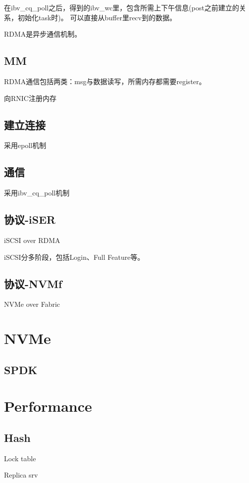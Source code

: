 在ibv\_cq\_poll之后，得到的ibv\_wc里，包含所需上下午信息(post之前建立的关系，初始化task时)。
可以直接从buffer里recv到的数据。

RDMA是异步通信机制。

\subsection{MM}

RDMA通信包括两类：msg与数据读写，所需内存都需要register。

向RNIC注册内存

\subsection{建立连接}

采用epoll机制

\subsection{通信}

采用ibv\_cq\_poll机制

\subsection{协议-iSER}

iSCSI over RDMA

iSCSI分多阶段，包括Login、Full Feature等。

\subsection{协议-NVMf}

NVMe over Fabric

\section{NVMe}

\subsection{SPDK}

\section{Performance}

\subsection{Hash}

\begin{enumbox}
\item Lock table
\item Replica srv
\end{enumbox}
